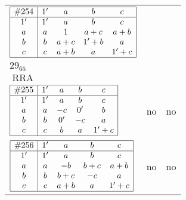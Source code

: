 \documentclass[12pt]{article}
\theoremstyle{definition}
\newcommand\RRA{\operatorname{RRA}}
\newcommand{\join}{\mathbin{+}}%
\newcommand{\id}{{1'}}%
\renewcommand{\div}{0'}
\renewcommand{\top}{1}%
\begin{document}
\begin{center}
\begin{longtable}{l|c|c}
$
\begin{array}{|c|cccc|} \hline
\#254 & \id & a & b & c \\ \hline
\id & \id & a & b & c \\
a & a & \top & a \join c & a \join b \\
b & b & a \join c & \id \join b & a \\
c & c & a \join b & a & \id \join c \\ \hline
\end{array}
$
 & \begin{tabular}{c} yes \\ $29_{65}$ \\ $\RRA$ \end{tabular} 
 & \adjustbox{valign=c, max height=1.6cm}{$
\left[ \begin{array}{cccccc}
\id & a & a & b & c & a \\ 
a & \id & a & a & b & b \\ 
a & a & \id & c & a & c \\ 
b & a & c & \id & a & c \\ 
c & b & a & a & \id & b \\ 
a & b & c & c & b & \id
\end{array}\right]
$}      \\[15mm]

$
\begin{array}{|c|cccc|} \hline
\#255 & \id & a & b & c \\ \hline
\id & \id & a & b & c \\
a & a & -c & \div & b \\
b & b & \div & -c & a \\
c & c & b & a & \id \join c \\ \hline
\end{array}
$
 & no  
 & no      \\[15mm]

$
\begin{array}{|c|cccc|} \hline
\#256 & \id & a & b & c \\ \hline
\id & \id & a & b & c \\
a & a & -b & b \join c & a \join b \\
b & b & b \join c & -c & a \\
c & c & a \join b & a & \id \join c \\ \hline
\end{array}
$
 & no  
 & no      \\[15mm]


\end{longtable}
\end{center}
\end{document}
